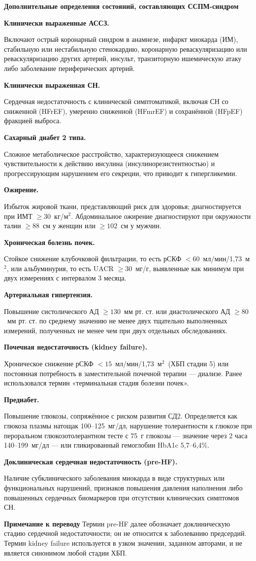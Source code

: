 \documentclass[11pt,a4paper]{article}
\newcommand{\editorial}[1]{\par\begingroup\small\color{black!70}\textbf{Примечание к переводу} #1\par\endgroup}
\newcommand{\heading}[1]{\par\medskip\textbf{#1}\par}
\newcommand{\unitgfr}{мл/мин/1,73~м$^2$}
\begin{document}
\heading{Дополнительные определения состояний, составляющих ССПМ-синдром}
\heading{Клинически выраженные АССЗ.} Включают острый коронарный синдром в анамнезе, инфаркт миокарда (ИМ), стабильную или нестабильную стенокардию, коронарную реваскуляризацию или реваскуляризацию других артерий, инсульт, транзиторную ишемическую атаку либо заболевание периферических артерий.
\heading{Клинически выраженная СН.} Сердечная недостаточность с клинической симптоматикой, включая СН со сниженной (HFrEF), умеренно сниженной (HFmrEF) и сохранённой (HFpEF) фракцией выброса.
\heading{Сахарный диабет 2 типа.} Сложное метаболическое расстройство, характеризующееся снижением чувствительности к действию инсулина (инсулинорезистентностью) и прогрессирующим нарушением его секреции, что приводит к гипергликемии.
\heading{Ожирение.} Избыток жировой ткани, представляющий риск для здоровья; диагностируется при ИМТ $\geq30$~кг/м$^2$. Абдоминальное ожирение диагностируют при окружности талии $\geq88$~см у женщин или $\geq102$~см у мужчин.
\heading{Хроническая болезнь почек.} Стойкое снижение клубочковой фильтрации, то есть рСКФ $<60$~\unitgfr, или альбуминурия, то есть UACR $\geq30$~мг/г, выявленные как минимум при двух измерениях с интервалом 3 месяца.
\heading{Артериальная гипертензия.} Повышение систолического АД $\geq130$~мм рт. ст. или диастолического АД $\geq80$~мм рт. ст. по среднему значению не менее двух тщательно выполненных измерений, полученных не менее чем при двух отдельных обследованиях.
\heading{Почечная недостаточность (kidney failure).} Хроническое снижение рСКФ $<15$~\unitgfr\ (ХБП стадии 5) или постоянная потребность в заместительной почечной терапии --- диализе. Ранее использовался термин «терминальная стадия болезни почек».
\heading{Предиабет.} Повышение глюкозы, сопряжённое с риском развития СД2. Определяется как глюкоза плазмы натощак 100--125~мг/дл, нарушение толерантности к глюкозе при пероральном глюкозотолерантном тесте с 75~г глюкозы --- значение через 2 часа 140--199~мг/дл --- или гликированный гемоглобин HbA1c 5,7--6,4\%.
\heading{Доклиническая сердечная недостаточность (pre-HF).} Наличие субклинического заболевания миокарда в виде структурных или функциональных нарушений, признаков повышения давления наполнения либо повышенных сердечных биомаркеров при отсутствии клинических симптомов СН.

\editorial{Термин pre-HF далее обозначает доклиническую стадию сердечной недостаточности; он не относится к заболеванию предсердий. Термин kidney failure используется в узком значении, заданном авторами, и не является синонимом любой стадии ХБП.}
\end{document}
